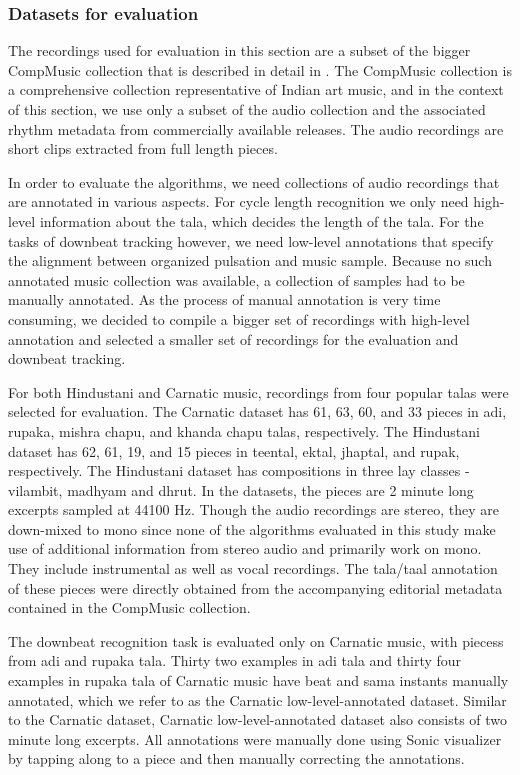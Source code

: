 \subsubsection{Datasets for evaluation}
The recordings used for evaluation in this section are a subset of the bigger CompMusic collection that is described in detail in . The CompMusic collection is a comprehensive collection representative of Indian art music, and in the context of this section, we use only a subset of the audio collection and the associated rhythm metadata from commercially available releases. The audio recordings are short clips extracted from full length pieces. 

In order to evaluate the algorithms, we need collections of audio recordings that are annotated in various aspects. For cycle length recognition we only need high-level information about the \gls{tala}, which decides the length of the \gls{tala}. For the tasks of downbeat tracking however, we need low-level annotations that specify the alignment between organized pulsation and music sample. Because no such annotated music collection was available, a collection of samples had to be manually annotated. As the process of manual annotation is very time consuming, we decided to compile a bigger set of recordings with high-level annotation and selected a smaller set of recordings for the evaluation and downbeat tracking. 

For both Hindustani and Carnatic music, recordings from four popular \glspl{tala} were selected for evaluation. The Carnatic dataset has 61, 63, 60, and 33 pieces in \gls{adi}, \gls{rupaka}, \gls{mishra chapu}, and \gls{khanda chapu} \glspl{tala}, respectively. The Hindustani dataset has 62, 61, 19, and 15 pieces in \gls{teental}, \gls{ektal}, \gls{jhaptal}, and \gls{rupak}, respectively. The Hindustani dataset has compositions in three \gls{lay} classes - \gls{vilambit}, \gls{madhyam} and \gls{dhrut}. In the datasets, the pieces are 2 minute long excerpts sampled at 44100 Hz. Though the audio recordings are stereo, they are down-mixed to mono since none of the algorithms evaluated in this study make use of additional information from stereo audio and primarily work on mono. They include instrumental as well as vocal recordings. The \gls{tala}/\gls{taal} annotation of these pieces were directly obtained from the accompanying editorial metadata contained in the CompMusic collection. 

The downbeat recognition task is evaluated only on Carnatic music, with piecess from \gls{adi} and \gls{rupaka} \gls{tala}. Thirty two examples in \gls{adi} \gls{tala} and thirty four examples in \gls{rupaka} \gls{tala} of Carnatic music have beat and sama instants manually annotated, which we refer to as the Carnatic low-level-annotated dataset. Similar to the Carnatic dataset, Carnatic low-level-annotated dataset also consists of two minute long excerpts. All annotations were manually done using Sonic visualizer~\cite{cannam:10:sv} by tapping along to a piece and then manually correcting the annotations. 
